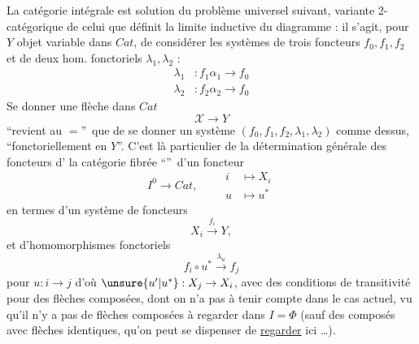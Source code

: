 La catégorie intégrale
est solution du problème universel suivant,  variante 2-catégorique de celui que définit la limite inductive du diagramme : il s'agit, pour $Y$ objet variable dans $\mathit{Cat}$, de considérer les systèmes de trois foncteurs $f_0,f_1,f_2$ et de deux hom. fonctoriels $\lambda_1,\lambda_2$ :
\[
\begin{aligned}
\lambda_1 &: f_1\alpha_1\to f_0\\
\lambda_2 &: f_2\alpha_2\to f_0
\end{aligned}
\]
Se donner une flèche dans $\mathit{Cat}$
\[
\mathscr X\longrightarrow Y
\]
\textquotedblleft revient au $=$\textquotedblright\ que de se donner un système $(f_0,f_1,f_2,\lambda_1,\lambda_2)$ comme dessus,  \textquotedblleft fonctoriellement en $Y$\textquotedblright. C'est là   particulier de la détermination générale des foncteurs d' la catégorie fibrée \textquotedblleft {}\textquotedblright\ d'un  foncteur
\[
I^0\longrightarrow\mathit{Cat},\qquad
\begin{aligned}i&\longmapsto X_i\\u&\longmapsto u^*\end{aligned}
\]
 en termes d'un système de foncteurs
\[
X_i\xrightarrow{f_i}Y ,
\]
et d'homomorphismes fonctoriels
\[
f_i\circ u^*\xrightarrow{\lambda_u} f_j
\]
pour $u:i\to j$ d'où $\unsure{u'|u^*}:X_j\to X_i$, avec des conditions de transitivité pour des flèches composées, dont on n'a pas à tenir compte dans le cas actuel, vu qu'il n'y a pas de flèches composées à regarder dans \deleted{$\unsure{\Phi}$} $I=\Phi$ (sauf des composés  avec flèches identiques,  qu'on peut se dispenser de \uline{regarder} ici \ldots).

